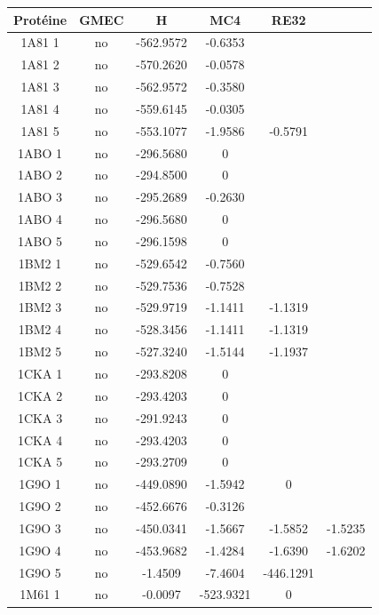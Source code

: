 \documentclass[a4paper,12pt]{article}
\begin{document}
    \begin{table}[h]
      \centering

      \begin{tabular}{|c|c|c|c|c|c|}

        Protéine & GMEC & H & MC4 & RE32 \\
        \hline
        1A81 1 & no & -562.9572 & -0.6353 & \\
        1A81 2 & no & -570.2620 & -0.0578 & \\
        1A81 3 & no & -562.9572 & -0.3580 & \\
        1A81 4 & no & -559.6145 & -0.0305 & \\
        1A81 5 & no & -553.1077 & -1.9586 & -0.5791 \\
        1ABO 1 & no & -296.5680 & 0 & \\
        1ABO 2 & no & -294.8500 & 0 & \\
        1ABO 3 & no & -295.2689 & -0.2630 & \\
        1ABO 4 & no & -296.5680 & 0 & \\
        1ABO 5 & no & -296.1598 & 0 & \\
        1BM2 1 & no & -529.6542 & -0.7560 & \\
        1BM2 2 & no & -529.7536 & -0.7528 & \\
        1BM2 3 & no & -529.9719 & -1.1411 & -1.1319 \\
        1BM2 4 & no & -528.3456 & -1.1411 & -1.1319 \\
        1BM2 5 & no & -527.3240 & -1.5144 & -1.1937 \\
        1CKA 1 & no & -293.8208 & 0 & \\
        1CKA 2 & no & -293.4203 & 0 & \\
        1CKA 3 & no & -291.9243 & 0 & \\
        1CKA 4 & no & -293.4203 & 0 & \\
        1CKA 5 & no & -293.2709 & 0 & \\
        1G9O 1 & no & -449.0890 & -1.5942 & 0 \\
        1G9O 2 & no & -452.6676 & -0.3126 & \\
        1G9O 3 & no & -450.0341 & -1.5667 & -1.5852 & -1.5235 \\
        1G9O 4 & no & -453.9682 & -1.4284 & -1.6390 & -1.6202 \\
        1G9O 5 & no & -1.4509 & -7.4604 & -446.1291 \\
        1M61 1 & no & -0.0097 & -523.9321 & 0 \\

\end{tabular}
\end{table}
\end{document}
